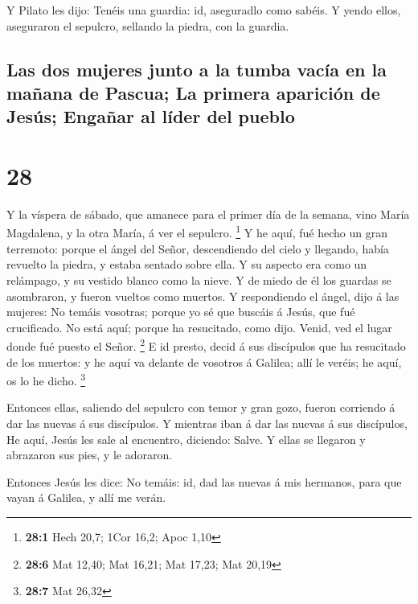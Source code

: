  Y Pilato les dijo: Tenéis una guardia: id, aseguradlo como
sabéis.  Y yendo ellos, aseguraron el sepulcro, sellando la
piedra, con la guardia.

\hypertarget{las-dos-mujeres-junto-a-la-tumba-vacuxeda-en-la-mauxf1ana-de-pascua-la-primera-apariciuxf3n-de-jesuxfas-engauxf1ar-al-luxedder-del-pueblo}{%
\subsection{Las dos mujeres junto a la tumba vacía en la mañana de
Pascua; La primera aparición de Jesús; Engañar al líder del
pueblo}\label{las-dos-mujeres-junto-a-la-tumba-vacuxeda-en-la-mauxf1ana-de-pascua-la-primera-apariciuxf3n-de-jesuxfas-engauxf1ar-al-luxedder-del-pueblo}}

\hypertarget{section-27}{%
\section{28}\label{section-27}}

 Y la víspera de sábado, que amanece para el primer día de
la semana, vino María Magdalena, y la otra María, á ver el sepulcro.
\footnote{\textbf{28:1} Hech 20,7; 1Cor 16,2; Apoc 1,10}  Y
he aquí, fué hecho un gran terremoto: porque el ángel del Señor,
descendiendo del cielo y llegando, había revuelto la piedra, y estaba
sentado sobre ella.  Y su aspecto era como un relámpago, y
su vestido blanco como la nieve.  Y de miedo de él los
guardas se asombraron, y fueron vueltos como muertos.  Y
respondiendo el ángel, dijo á las mujeres: No temáis vosotras; porque yo
sé que buscáis á Jesús, que fué crucificado.  No está aquí;
porque ha resucitado, como dijo. Venid, ved el lugar donde fué puesto el
Señor. \footnote{\textbf{28:6} Mat 12,40; Mat 16,21; Mat 17,23; Mat
  20,19}  E id presto, decid á sus discípulos que ha
resucitado de los muertos: y he aquí va delante de vosotros á Galilea;
allí le veréis; he aquí, os lo he dicho. \footnote{\textbf{28:7} Mat
  26,32}

 Entonces ellas, saliendo del sepulcro con temor y gran
gozo, fueron corriendo á dar las nuevas á sus discípulos. Y mientras
iban á dar las nuevas á sus discípulos,  He aquí, Jesús les
sale al encuentro, diciendo: Salve. Y ellas se llegaron y abrazaron sus
pies, y le adoraron.

 Entonces Jesús les dice: No temáis: id, dad las nuevas á
mis hermanos, para que vayan á Galilea, y allí me verán.

